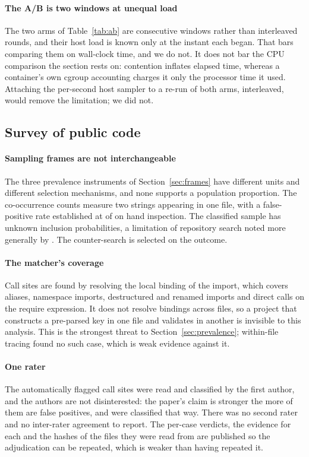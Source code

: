 \documentclass[preprint,12pt,authoryear]{elsarticle}
\begin{document}
\paragraph{The A/B is two windows at unequal load} The two arms of
Table~\ref{tab:ab} are consecutive windows rather than interleaved rounds, and
their host load is known only at the instant each began. That bars comparing
them on wall-clock time, and we do not. It does not bar the CPU comparison the
section rests on: contention inflates elapsed time, whereas a container's own
cgroup accounting charges it only the processor time it used. Attaching the
per-second host sampler to a re-run of both arms, interleaved, would remove the
limitation; we did not.

\subsection{Survey of public code}\label{sec:threats-survey}

\paragraph{Sampling frames are not interchangeable} The three prevalence
instruments of Section~\ref{sec:frames} have different units and different
selection mechanisms, and none supports a population proportion. The
co-occurrence counts measure two strings appearing in one file, with a
false-positive rate established at \AdjudicatedFalsePositive{} of
\AdjudicatedTotal{} on hand inspection. The classified sample has unknown
inclusion probabilities, a limitation of repository search noted more generally
by \citet{kalliamvakou2014promises}. The counter-search is
selected on the outcome.

\paragraph{The matcher's coverage} Call sites are found by resolving the local
binding of the import, which covers aliases, namespace imports, destructured and
renamed imports and direct calls on the require expression. It does not resolve
bindings across files, so a project that constructs a pre-parsed key in one file
and validates in another is invisible to this analysis. This is the strongest
threat to Section~\ref{sec:prevalence}; within-file tracing found no such case,
which is weak evidence against it.

\paragraph{One rater} The \AdjudicatedTotal{} automatically flagged call sites
were read and classified by the first author, and the authors are not
disinterested: the paper's claim is stronger the more of them are false
positives, and \AdjudicatedFalsePositive{} were classified that way. There was no
second rater and no inter-rater agreement to report. The per-case verdicts, the
evidence for each and the hashes of the files they were read from are published
so the adjudication can be repeated, which is weaker than having repeated it.
\end{document}
